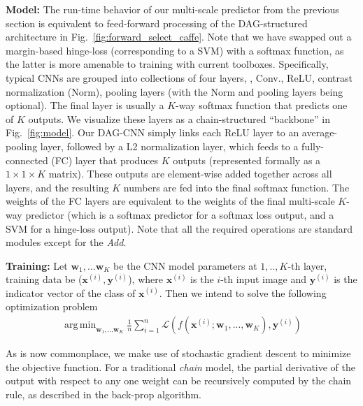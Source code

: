 \documentclass[10pt,twocolumn,letterpaper]{article}
\DeclareMathOperator*{\argmin}{arg\,min}
\begin{document}
{\bf Model:} The run-time behavior of our multi-scale predictor from the previous section is equivalent to feed-forward processing of the DAG-structured architecture in Fig.~\ref{fig:forward_select_caffe}. Note that we have swapped out a margin-based hinge-loss (corresponding to a SVM) with a softmax function, as the latter is more amenable to training with current toolboxes. Specifically, typical CNNs are grouped into collections of four layers, \ie, Conv., ReLU, contrast normalization (Norm), pooling layers (with the Norm and pooling layers being optional). The final layer is usually a $K$-way softmax function that predicts one of $K$ outputs. We visualize these layers as a chain-structured ``backbone'' in Fig.~\ref{fig:model}. Our DAG-CNN simply links each ReLU layer to an average-pooling layer, followed by a L2 normalization layer, which feeds to a fully-connected (FC) layer that produces $K$ outputs (represented formally as a $1 \times 1 \times K$ matrix). These outputs are element-wise added together across all layers, and the resulting $K$ numbers are fed into the final softmax function. The weights of the FC layers are equivalent to the weights of the final multi-scale $K$-way predictor (which is a softmax predictor for a softmax loss output, and a SVM for a hinge-loss output). Note that all the required operations are standard modules except for the \textit{Add}.


{\bf Training:} Let $\textbf{w}_1,...\textbf{w}_K$ be the CNN model parameters at $1,..,K$-th layer, training data be ($\textbf{x}^{(i)},\textbf{y}^{(i)}$), where $\textbf{x}^{(i)}$ is the $i$-th input image and $\textbf{y}^{(i)}$ is the indicator vector of the class of $\textbf{x}^{(i)}$. Then we intend to solve the following optimization problem
\vspace{-5}
\begin{align}
\argmin_{\textbf{w}_1,...\textbf{w}_K} \frac{1}{n}\sum_{i=1}^{n} \mathcal{L}(f(\textbf{x}^{(i)};\textbf{w}_1,...,\textbf{w}_K),\textbf{y}^{(i)})
\end{align}

As is now commonplace, we make use of stochastic gradient descent to minimize the objective function. For a traditional \textit{chain} model, the partial derivative of the output with respect to any one weight can be recursively computed by the chain rule, as described in the back-prop algorithm.%
\end{document}
